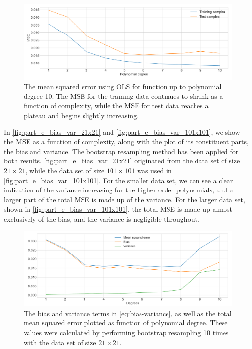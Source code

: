\documentclass[12pt]{article}
\begin{document}
\begin{figure}
    \centering
    \includegraphics[width=1\linewidth]{images/part_e_MSE_deg10.pdf}
    \caption{The mean squared error using OLS for function up to polynomial degree 10. The MSE for the training data continues to shrink as a function of complexity, while the MSE for test data reaches a plateau and begins slightly increasing.}
    \label{fig:part_e_MSE_deg10}
\end{figure}

In \autoref{fig:part_e_bias_var_21x21} and \autoref{fig:part_e_bias_var_101x101}, we show the MSE as a function of complexity, along with the plot of its constituent parts, the bias and variance. The bootstrap resampling method has been applied for both results. \autoref{fig:part_e_bias_var_21x21} originated from the data set of size $21 \times 21$, while the data set of size $101 \times 101$ was used in \autoref{fig:part_e_bias_var_101x101}. For the smaller data set, we can see a clear indication of the variance increasing for the higher order polynomials, and a larger part of the total MSE is made up of the variance. For the larger data set, shown in \autoref{fig:part_e_bias_var_101x101}, the total MSE is made up almost exclusively of the bias, and the variance is negligible throughout. 

\begin{figure}
    \centering
    \includegraphics[width=1\linewidth]{images/part_e_bias_var_21x21.pdf}
    \caption{The bias and variance terms in \autoref{eq:bias-variance}, as well as the total mean squared error plotted as function of polynomial degree. These values were calculated by performing bootstrap resampling 10 times with the data set of size $21\times21$.}
    \label{fig:part_e_bias_var_21x21}
\end{figure}
\end{document}
